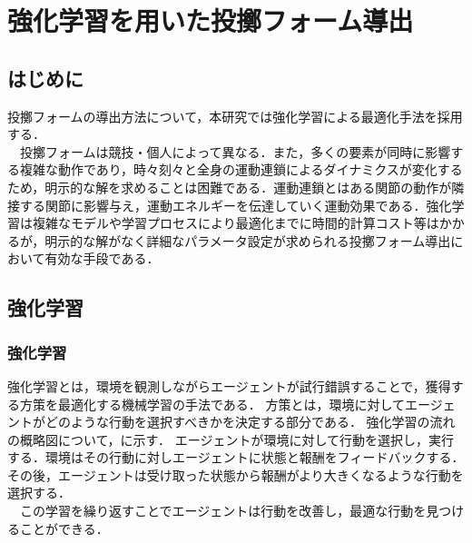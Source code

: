 \chapter[強化学習を用いた投擲フォーム導出]{強化学習を用いた投擲フォーム導出}

\section{はじめに}
投擲フォームの導出方法について，本研究では強化学習による最適化手法を採用する．\\
　投擲フォームは競技・個人によって異なる．また，多くの要素が同時に影響する複雑な動作であり，時々刻々と全身の運動連鎖\cite{iwasako}\cite{burkhart}によるダイナミクスが変化するため，明示的な解を求めることは困難である．運動連鎖とはある関節の動作が隣接する関節に影響与え，運動エネルギーを伝達していく運動効果である．強化学習は複雑なモデルや学習プロセスにより最適化までに時間的計算コスト等はかかるが，明示的な解がなく詳細なパラメータ設定が求められる投擲フォーム導出において有効な手段である．

\section{強化学習}
\subsection{強化学習}
強化学習\cite{rl1}\cite{rl2}とは，環境を観測しながらエージェントが試行錯誤することで，獲得する方策を最適化する機械学習の手法である．
方策とは，環境に対してエージェントがどのような行動を選択すべきかを決定する部分である．
強化学習の流れの概略図について，に示す．
エージェントが環境に対して行動を選択し，実行する．環境はその行動に対しエージェントに状態と報酬をフィードバックする．
その後，エージェントは受け取った状態から報酬がより大きくなるような行動を選択する．\\
　この学習を繰り返すことでエージェントは行動を改善し，最適な行動を見つけることができる．
